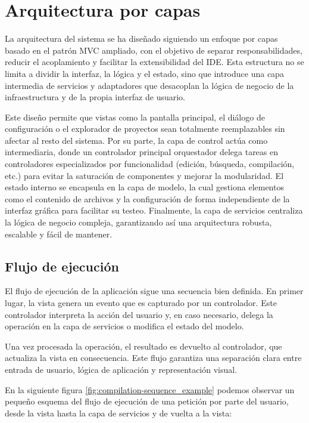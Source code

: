 \documentclass[../main.tex]{subfiles}
\begin{document}
\clearpage


\section{Arquitectura por capas}

La arquitectura del sistema se ha diseñado siguiendo un enfoque por capas basado en el patrón MVC ampliado, con el objetivo de separar responsabilidades, reducir el acoplamiento y facilitar la extensibilidad del IDE. Esta estructura no se limita a dividir la interfaz, la lógica y el estado, sino que introduce una capa intermedia de servicios y adaptadores que desacoplan la lógica de negocio de la infraestructura y de la propia interfaz de usuario. 

Este diseño permite que vistas como la pantalla principal, el diálogo de configuración o el explorador de proyectos sean totalmente reemplazables sin afectar al resto del sistema. Por su parte, la capa de control actúa como intermediaria, donde un controlador principal orquestador delega tareas en controladores especializados por funcionalidad (edición, búsqueda, compilación, etc.) para evitar la saturación de componentes y mejorar la modularidad. El estado interno se encapsula en la capa de modelo, la cual gestiona elementos como el contenido de archivos y la configuración de forma independiente de la interfaz gráfica para facilitar su testeo. Finalmente, la capa de servicios centraliza la lógica de negocio compleja, garantizando así una arquitectura robusta, escalable y fácil de mantener.

\subsection{Flujo de ejecución}

El flujo de ejecución de la aplicación sigue una secuencia bien definida. En primer lugar, la vista genera un evento que es capturado por un controlador. Este controlador interpreta la acción del usuario y, en caso necesario, delega la operación en la capa de servicios o modifica el estado del modelo.

Una vez procesada la operación, el resultado es devuelto al controlador, que actualiza la vista en consecuencia. Este flujo garantiza una separación clara entre entrada de usuario, lógica de aplicación y representación visual.

En la siguiente figura \ref{fig:compilation-sequence_example} podemos observar un pequeño esquema del flujo de ejecución de una petición por parte del usuario, desde la vista hasta la capa de servicios y de vuelta a la vista:
\end{document}
